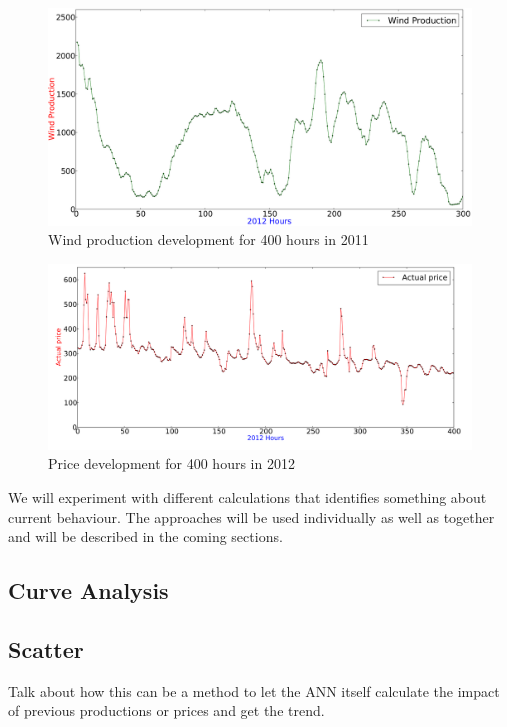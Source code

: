 \begin{figure}[H]
\centering
\includegraphics[width=0.99\linewidth,natwidth=898,natheight=587]{billeder/productionTendency400Hours.png}
\caption{Wind production development for 400 hours in 2011}
\label{fig:windHourDevelopment400HoursStatistics}
\end{figure}

\begin{figure}[H]
\centering
\includegraphics[width=0.99\linewidth,natwidth=898,natheight=587]{billeder/priceGraph400.png}
\caption{Price development for 400 hours in 2012}
\label{fig:priceHourDevelopment400HoursStatistics}
\end{figure}

We will experiment with different calculations that identifies something about current behaviour. The approaches will be used individually as well as together and will be described in the coming sections.

\subsection{Curve Analysis}
\label{sec:curveAnalysis}

\subsection{Scatter}
\label{sec:scatterStrategy}
Talk about how this can be a method to let the ANN itself calculate the impact of previous productions or prices and get the trend.

